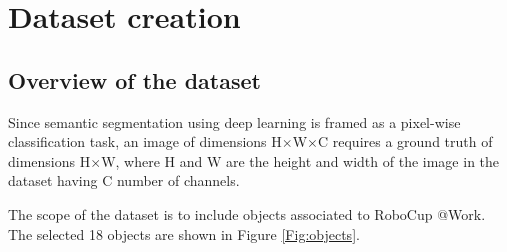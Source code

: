 
\chapter{Dataset creation}

\section{Overview of the dataset}
Since semantic segmentation using deep learning is framed as a pixel-wise classification task, an image of dimensions H$\times$W$\times$C requires a ground truth of dimensions H$\times$W, where H and W are the height and width of the image in the dataset having C number of channels. 

The scope of the dataset is to include objects associated to RoboCup @Work. The selected 18 objects are shown in Figure \ref{Fig:objects}.

